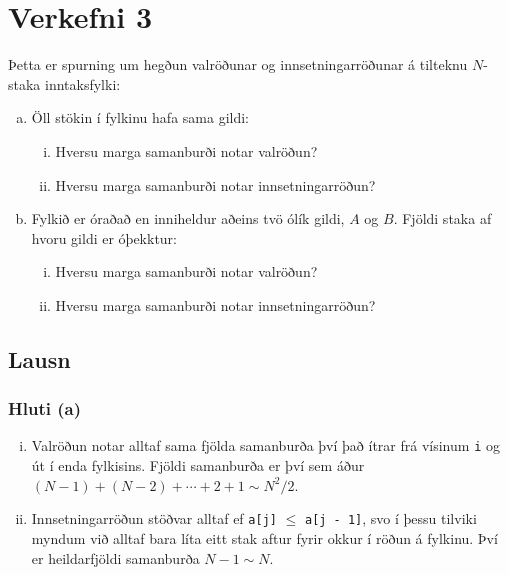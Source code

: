 \documentclass[12pt, a4paper, hidelinks]{article}
\begin{document}
\section*{Verkefni 3}
Þetta er spurning um hegðun valröðunar og innsetningarröðunar á tilteknu $N$-staka inntaksfylki:
\begin{enumerate}[(a)]
    \item Öll stökin í fylkinu hafa sama gildi:
    \begin{enumerate}[(i)]
        \item Hversu marga samanburði notar valröðun?
        \item Hversu marga samanburði notar innsetningarröðun?
    \end{enumerate}
    \item Fylkið er óraðað en inniheldur aðeins tvö ólík gildi, $A$ og $B$. Fjöldi staka af hvoru
    gildi er óþekktur:
    \begin{enumerate}[(i)]
        \item Hversu marga samanburði notar valröðun?
        \item Hversu marga samanburði notar innsetningarröðun?
    \end{enumerate}
\end{enumerate}

\subsection*{Lausn}
\subsubsection*{Hluti (a)}
    \begin{enumerate}[(i)]
        \item Valröðun notar alltaf sama fjölda samanburða því það ítrar frá vísinum \texttt{i}
        og út í enda fylkisins. Fjöldi samanburða er því sem áður $(N - 1) + (N - 2) + \cdots + 2 + 1 \sim N^2/2$.
        \item Innsetningarröðun stöðvar alltaf ef \texttt{a[j]} $\leq$ \texttt{a[j - 1]}, svo í þessu tilviki myndum við alltaf
        bara líta eitt stak aftur fyrir okkur í röðun á fylkinu. Því er heildarfjöldi samanburða $N - 1 \sim N$.
    \end{enumerate}
\end{document}
